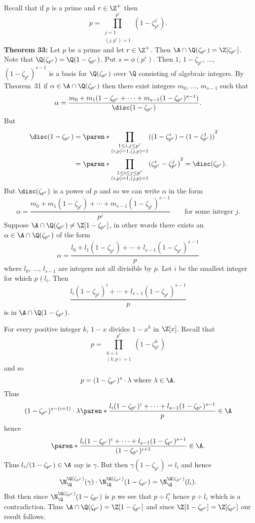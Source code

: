 Recall that if $p$ is a prime and $r\in\Z^+$ then
\[ p = \prod_{\substack{j=1\\(j,p^r)=1}}^{p^r}(1-\zeta_{p^r}^j) . \]
\textbf{Theorem 33:} Let $p$ be a prime and let $r\in\Z^+$.  Then $\A\cap\Q(\zeta_{p^r})=\Z[\zeta_{p^r}]$. \\
\pf Note that $\Q(\zeta_{p^r})=\Q(1-\zeta_{p^r})$.  Put $s=\phi(p^r)$.  Then $1$, $1-\zeta_{p^r}$, $\dotsc$, $(1-\zeta_{p^r})^{s-1}$ is a basis for $\Q(\zeta_{p^r})$ over $\Q$ consisting of algebraic integers.  By Theorem~31 if $\alpha\in\A\cap\Q(\zeta_{p^r})$ then there exist integers $m_0$, $\dotsc$, $m_{s-1}$ such that
\[ \alpha = \frac{m_0+m_1(1-\zeta_{p^r}+\dotsb+m_{s-1}(1-\zeta_{p^r})^{s-1})}{\disc(1-\zeta_{p^r})} . \]
But
\begin{align*}
\disc(1-\zeta_{p^r}) &= \paren*{\prod_{\substack{1\leq i,j\leq p^r\\(i,p)=1,(j,p)=1}}((1-\zeta_{p^r}^i)-(1-\zeta_{p^r}^j))}^2 \\
&= \paren*{\prod_{\substack{1\leq i\leq j\leq p^r\\(i,p)=1,(j,p)=1}}(\zeta_{p^r}^i-\zeta_{p^r}^j)}^2 = \disc(\zeta_{p^r}) .
\end{align*}
But $\disc(\zeta_{p^r})$ is a power of $p$ and so we can write $\alpha$ in the form
\[ \alpha = \frac{m_0+m_1(1-\zeta_{p^r})+\dotsb+m_{s-1}(1-\zeta_{p^r})^{s-1}}{p^j} \qquad \text{for some integer $j$.} \]
Suppose $\A\cap\Q(\zeta_{p^r})\neq\Z[1-\zeta_{p^r}]$, in other words there exists an $\alpha\in\A\cap\Q(\zeta_{p^r})$ of the form
\[ \alpha = \frac{l_0+l_1(1-\zeta_{p^r})+\dotsb+l_{s-1}(1-\zeta_{p^r})^{s-1}}{p} \]
where $l_0$, $\dotsc$, $l_{s-1}$ are integers not all divisible by $p$.  Let $i$ be the smallest integer for which $p\nmid l_i$.  Then
\[ \frac{l_i(1-\zeta_{p^r})^i+\dotsb+l_{s-1}(1-\zeta_{p^r})^{s-1}}{p} \]
is in $\A\cap\Q(1-\zeta_{p^r})$.

For every positive integer $k$, $1-x$ divides $1-x^k$ in $\Z[x]$.  Recall that
\[ p = \prod_{\substack{k=1\\(k,p)=1}}^{p^r}(1-\zeta_{p^r}^k) \]
and so
\[ p = (1-\zeta_{p^r})^s\cdot\lambda \text{ where }\lambda\in\A . \]
Thus
\[ (1-\zeta_{p^r})^{s-(i+1)}\cdot\lambda\paren*{\frac{l_i(1-\zeta_{p^r})^i+\dotsb+l_{s-1}(1-\zeta_{p^r})^{s-1}}{p}}\in\A \]
hence
\[ \paren*{\frac{l_i(1-\zeta_{p^r})^i+\dotsb+l_{s-1}(1-\zeta_{p^r})^{s-1}}{(1-\zeta_{p^r})^{i+1}}} \in \A . \]
Thus $l_i/(1-\zeta_{p^r})\in\A$ say is $\gamma$.  But then $\gamma(1-\zeta_{p^r})=l_i$ and hence
\[ \N_\Q^{\Q(\zeta_{p^r})}(\gamma)\cdot\N_\Q^{\Q(\zeta_{p^r})}(1-\zeta_{p^r}) = \N_\Q^{\Q(\zeta_{p^r})}(l_i) . \]
But then since $\N_\Q^{\Q(\zeta_{p^r})}(1-\zeta_{p^r})$ is $p$ we see that $p\div l_i^s$ hence $p\div l_i$ which is a contradiction.  Thus $\A\cap\Q(\zeta_{p^r})=\Z[1-\zeta_{p^r}]$ and since $\Z[1-\zeta_{p^r}]=\Z[\zeta_{p^r}]$ our result follows.

